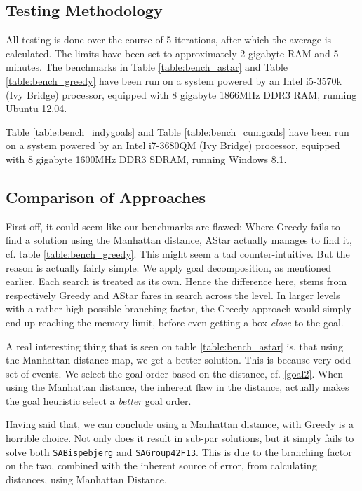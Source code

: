 \documentclass[letterpaper]{article}
\begin{document}
	\subsection{Testing Methodology}
		All testing is done over the course of 5 iterations, after which the average is calculated. The limits have been set to approximately 2 gigabyte RAM and 5 minutes. The benchmarks in Table \ref{table:bench_astar} and Table \ref{table:bench_greedy} have been run on a system powered by an Intel i5-3570k (Ivy Bridge) processor, equipped with 8 gigabyte 1866MHz DDR3 RAM, running Ubuntu 12.04.
		
		Table \ref{table:bench_indygoals} and Table \ref{table:bench_cumgoals} have been run on a system powered by an Intel i7-3680QM (Ivy Bridge) processor, equipped with 8 gigabyte 1600MHz DDR3 SDRAM, running Windows 8.1.

	\subsection{Comparison of Approaches}
		First off, it could seem like our benchmarks are flawed: Where Greedy fails to find a solution using the Manhattan distance, AStar actually manages to find it, cf. table \ref{table:bench_greedy}. This might seem a tad counter-intuitive. But the reason is actually fairly simple:  We apply goal decomposition, as mentioned earlier. Each search is treated as its own. Hence the difference here, stems from respectively Greedy and AStar fares in search across the level. In larger levels with a rather high possible branching factor, the Greedy approach would simply end up reaching the memory limit, before even getting a box \emph{close} to the goal.

		A real interesting thing that is seen on table \ref{table:bench_astar} is, that using the Manhattan distance map, we get a better solution. This is because very odd set of events. We select the goal order based on the distance, cf. \ref{goal2}. When using the Manhattan distance, the inherent flaw in the distance, actually makes the goal heuristic select a \emph{better} goal order.

		Having said that, we can conclude using a Manhattan distance, with Greedy is a horrible choice. Not only does it result in sub-par solutions, but it simply fails to solve both \verb=SABispebjerg= and \verb=SAGroup42F13=. This is due to the branching factor on the two, combined with the inherent source of error, from calculating distances, using Manhattan Distance. 
\end{document}
